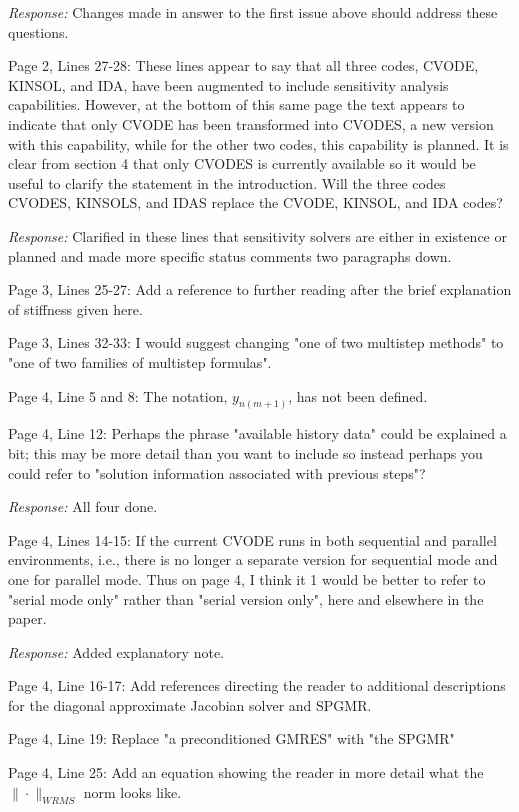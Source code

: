 \documentclass[12pt]{letter}
\begin{document}
{\em Response: } Changes made in answer to the first issue above
should address these questions.

Page 2, Lines 27-28: These lines appear to say that all three codes,
CVODE, KINSOL, and IDA, have been augmented to include sensitivity
analysis capabilities. However, at the bottom of this same page the
text appears to indicate that only CVODE has been transformed into
CVODES, a new version with this capability, while for the other two
codes, this capability is planned. It is clear from section 4 that
only CVODES is currently available so it would be useful to clarify
the statement in the introduction. Will the three codes CVODES,
KINSOLS, and IDAS replace the CVODE, KINSOL, and IDA codes?

{\em Response: } Clarified in these lines that sensitivity solvers
are either in existence or planned and made more specific status
comments two paragraphs down.

Page 3, Lines 25-27: Add a reference to further reading after the
brief explanation of stiffness given here.

Page 3, Lines 32-33: I would suggest changing "one of two multistep
methods" to "one of two families of multistep formulas".

Page 4, Line 5 and 8: The notation, $y_{n(m+1)}$, has not been defined.

Page 4, Line 12: Perhaps the phrase "available history data" could be
explained a bit; this may be more detail than you want to include so
instead perhaps you could refer to "solution information associated
with previous steps"?

{\em Response:} All four done.

Page 4, Lines 14-15: If the current CVODE runs in both sequential and
parallel environments, i.e., there is no longer a separate version for
sequential mode and one for parallel mode. Thus on page 4, I think it
1 would be better to refer to "serial mode only" rather than "serial
version only", here and elsewhere in the paper.

{\em Response:} Added explanatory note.

Page 4, Line 16-17: Add references directing the reader to additional
descriptions for the diagonal approximate Jacobian solver and SPGMR.

Page 4, Line 19: Replace "a preconditioned GMRES" with "the SPGMR"

Page 4, Line 25: Add an equation showing the reader in more detail
what the $\|\cdot\|_{WRMS}$ norm looks like.
\end{document}
